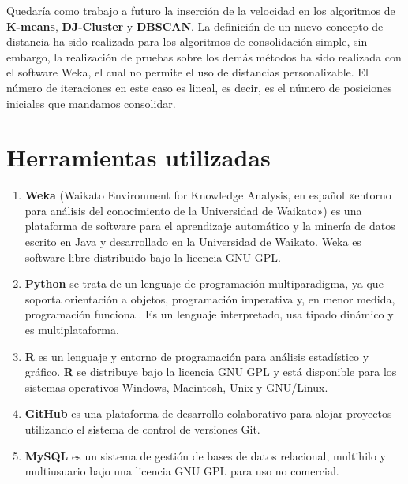 \documentclass[a4paper, 12pt]{article}
\begin{document}
Quedar\'ia como trabajo a futuro la inserci\'on de la velocidad en los algoritmos de \textbf{K-means}, \textbf{DJ-Cluster} y \textbf{DBSCAN}. La definici\'on de un nuevo concepto de distancia ha sido realizada para los algoritmos de consolidaci\'on simple, sin embargo, la realizaci\'on de pruebas sobre los dem\'as m\'etodos ha sido realizada con el software Weka, el cual no permite el uso de distancias personalizable. El n\'umero de iteraciones en este caso es lineal, es decir, es el n\'umero de posiciones iniciales que mandamos consolidar.\\


\pagebreak
\section{Herramientas utilizadas}

\begin{enumerate}
	\item \textbf{Weka} (Waikato Environment for Knowledge Analysis, en espa\~nol «entorno para an\'alisis del conocimiento de la Universidad de Waikato») es una plataforma de software para el aprendizaje autom\'atico y la miner\'ia de datos escrito en Java y desarrollado en la Universidad de Waikato. Weka es software libre distribuido bajo la licencia GNU-GPL.\cite{weka}
	
	\item \textbf{Python} se trata de un lenguaje de programaci\'on multiparadigma, ya que soporta orientaci\'on a objetos, programaci\'on imperativa y, en menor medida, programaci\'on funcional. Es un lenguaje interpretado, usa tipado dinámico y es multiplataforma.
	
	\item \textbf{R} es un lenguaje y entorno de programaci\'on para an\'alisis estad\'istico y gr\'afico. \textbf{R} se distribuye bajo la licencia GNU GPL y est\'a disponible para los sistemas operativos Windows, Macintosh, Unix y GNU/Linux.\cite{r}
	
	\item \textbf{GitHub} es una plataforma de desarrollo colaborativo para alojar proyectos utilizando el sistema de control de versiones Git.
	
	\item \textbf{MySQL} es un sistema de gesti\'on de bases de datos relacional, multihilo y multiusuario bajo una licencia GNU GPL para uso no comercial.
	
\end{enumerate}
\end{document}
